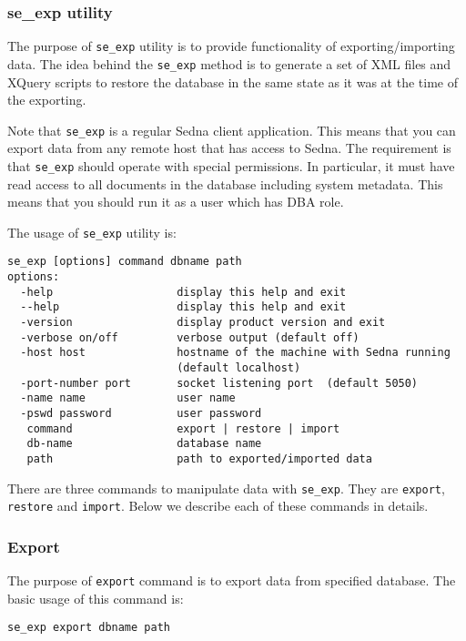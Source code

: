 \documentclass[a4paper,12pt]{article}
\begin{document}
\subsubsection{se\_exp utility}

The purpose of \verb!se_exp! utility is to provide functionality of exporting/importing data. The 
idea behind the \verb!se_exp! method is to generate a set of XML files and XQuery 
scripts to restore the database in the same state as it was at the time of the exporting. 

Note that \verb!se_exp! is a regular Sedna client application. This means that you can export data from
any remote host that has access to Sedna. The requirement is that \verb!se_exp! should operate with 
special permissions. In particular, it must have read access to all documents in the database including 
system metadata. This means that you should run it as a user which has DBA role.

The usage of \verb!se_exp! utility is:

\begin{verbatim}
se_exp [options] command dbname path
options:
  -help                   display this help and exit
  --help                  display this help and exit
  -version                display product version and exit
  -verbose on/off         verbose output (default off)
  -host host              hostname of the machine with Sedna running
                          (default localhost)
  -port-number port       socket listening port  (default 5050)
  -name name              user name
  -pswd password          user password
   command                export | restore | import
   db-name                database name
   path                   path to exported/imported data
\end{verbatim}


There are three commands to manipulate data with \verb!se_exp!. They are \verb!export!,
\verb!restore! and \verb!import!. Below we describe each of these commands in details.




\subsubsection*{Export}
The purpose of \verb!export! command is to export data from specified database. The basic usage 
of this command is:

\begin{verbatim}
se_exp export dbname path
\end{verbatim}
\end{document}
